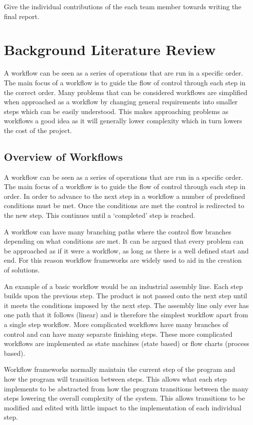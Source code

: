 \documentclass[12pt]{report}
\makeatletter
\def\sectionnote#1{\def\@sectionnote{#1}}%
\let\@sectionnote\@empty%
\makeatother
\begin{document}
Give the individual contributions of the each team member towards writing the
final report.


\chapter{Background Literature Review}

A workflow can be seen as a series of operations that are run in a specific order. The main focus of a workflow is to guide the flow of control through each step in the correct order. Many problems that can be considered workflows are simplified when approached as a workflow by changing general requirements into smaller steps which can be easily understood. This makes approaching problems as workflows a good idea as it will generally lower complexity which in turn lowers the cost of the project.


\sectionnote{AC}
\section{Overview of Workflows}

A workflow can be seen as a series of operations that are run in a specific order. The main focus of a workflow is to guide the flow of control through each step in order. In order to advance to the next step in a workflow a number of predefined conditions must be met. Once the conditions are met the control is redirected to the new step. This continues until a ‘completed’ step is reached.

A workflow can have many branching paths where the control flow branches depending on what conditions are met. It can be argued that every problem can be approached as if it were a workflow, as long as there is a well defined start and end. For this reason workflow frameworks are widely used to aid in the creation of solutions.

An example of a basic workflow would be an industrial assembly line. Each step builds upon the previous step. The product is not passed onto the next step until it meets the conditions imposed by the next step. The assembly line only ever has one path that it follows (linear) and is therefore the simplest workflow apart from a single step workflow. More complicated workflows have many branches of control and can have many separate finishing steps. These more complicated workflows are implemented as state machines (state based) or flow charts (process based).

Workflow frameworks normally maintain the current step of the program and how the program will transition between steps. This allows what each step implements to be abstracted from how the program transitions between the many steps lowering the overall complexity of the system. This allows transitions to be modified and edited with little impact to the implementation of each individual step.
\end{document}
